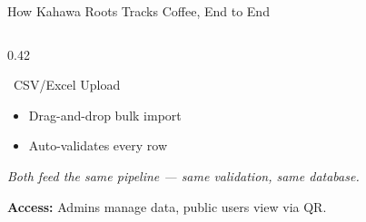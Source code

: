 \documentclass[aspectratio=169]{beamer}
\begin{document}
\begin{frame}{How Kahawa Roots Tracks Coffee, End to End}
\begin{columns}[T]
\begin{column}{0.42\textwidth}
\vspace{-0.5em}
\begin{block}{\faFileExcel\ CSV/Excel Upload}
    \begin{itemize}\setlength{\itemsep}{0pt}
        \item Drag-and-drop bulk import
        \item Auto-validates every row
    \end{itemize}
    \vspace{-0.4em}
\end{block}

\vspace{-0.5em}
{\scriptsize\textit{Both feed the same pipeline — same validation, same database.}}

\vspace{0.2em}
{\scriptsize\textbf{Access:} Admins manage data, public users view via QR.}

\end{column}

\end{columns}

\end{frame}
\end{document}
